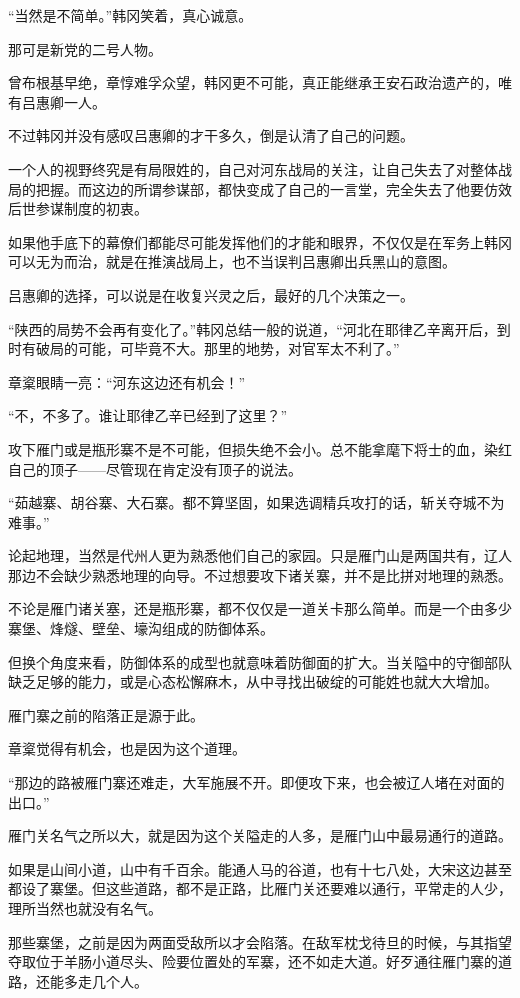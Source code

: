 “当然是不简单。”韩冈笑着，真心诚意。

那可是新党的二号人物。

曾布根基早绝，章惇难孚众望，韩冈更不可能，真正能继承王安石政治遗产的，唯有吕惠卿一人。

不过韩冈并没有感叹吕惠卿的才干多久，倒是认清了自己的问题。

一个人的视野终究是有局限姓的，自己对河东战局的关注，让自己失去了对整体战局的把握。而这边的所谓参谋部，都快变成了自己的一言堂，完全失去了他要仿效后世参谋制度的初衷。

如果他手底下的幕僚们都能尽可能发挥他们的才能和眼界，不仅仅是在军务上韩冈可以无为而治，就是在推演战局上，也不当误判吕惠卿出兵黑山的意图。

吕惠卿的选择，可以说是在收复兴灵之后，最好的几个决策之一。

“陕西的局势不会再有变化了。”韩冈总结一般的说道，“河北在耶律乙辛离开后，到时有破局的可能，可毕竟不大。那里的地势，对官军太不利了。”

章楶眼睛一亮：“河东这边还有机会！”

“不，不多了。谁让耶律乙辛已经到了这里？”

攻下雁门或是瓶形寨不是不可能，但损失绝不会小。总不能拿麾下将士的血，染红自己的顶子——尽管现在肯定没有顶子的说法。

“茹越寨、胡谷寨、大石寨。都不算坚固，如果选调精兵攻打的话，斩关夺城不为难事。”

论起地理，当然是代州人更为熟悉他们自己的家园。只是雁门山是两国共有，辽人那边不会缺少熟悉地理的向导。不过想要攻下诸关寨，并不是比拼对地理的熟悉。

不论是雁门诸关塞，还是瓶形寨，都不仅仅是一道关卡那么简单。而是一个由多少寨堡、烽燧、壁垒、壕沟组成的防御体系。

但换个角度来看，防御体系的成型也就意味着防御面的扩大。当关隘中的守御部队缺乏足够的能力，或是心态松懈麻木，从中寻找出破绽的可能姓也就大大增加。

雁门寨之前的陷落正是源于此。

章楶觉得有机会，也是因为这个道理。

“那边的路被雁门寨还难走，大军施展不开。即便攻下来，也会被辽人堵在对面的出口。”

雁门关名气之所以大，就是因为这个关隘走的人多，是雁门山中最易通行的道路。

如果是山间小道，山中有千百余。能通人马的谷道，也有十七八处，大宋这边甚至都设了寨堡。但这些道路，都不是正路，比雁门关还要难以通行，平常走的人少，理所当然也就没有名气。

那些寨堡，之前是因为两面受敌所以才会陷落。在敌军枕戈待旦的时候，与其指望夺取位于羊肠小道尽头、险要位置处的军寨，还不如走大道。好歹通往雁门寨的道路，还能多走几个人。

